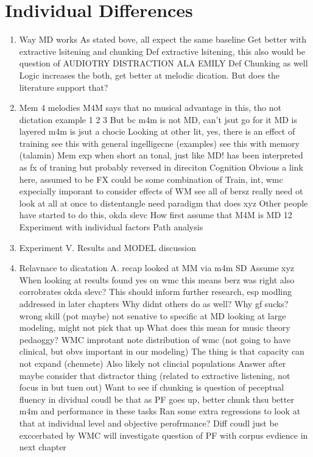 \documentclass[]{book}
\begin{document}
\hypertarget{individual-differences-1}{%
\section{Individual Differences}\label{individual-differences-1}}

\begin{enumerate}
\def\labelenumi{\Roman{enumi}.}
\setcounter{enumi}{1}
\item
  Way MD works
  As stated bove, all expect the same baseline
  Get better with extractive lsitening and chunking
  Def extractive lsitening, this also would be question of AUDIOTRY DISTRACTION ALA EMILY
  Def Chunking as well
  Logic increases the both, get better at melodic dication.
  But does the literature support that?
\item
  Mem 4 melodies
  M4M says that no musical advantage in this, tho not dictation
  example 1 2 3
  But bc m4m is not MD, can't jsut go for it
  MD is layered
  m4m is jsut a chocie
  Looking at other lit, yes, there is an effect of training
  see this with general ingelligecne (examples)
  see this with memory (talamin)
  Mem exp when short an tonal, just like MD!
  has been interpreted as fx of traning
  but probably reversed in direciton
  Cognition
  Obvious a link here, assumed to be FX
  could be some combination of Train, int, wmc
  expecially imporant to consider effects of WM
  see all of bersz
  really need ot look at all at once to distentangle
  need paradigm that does xyz
  Other people have started to do this, okda slevc
  How
  first assume that M4M is MD 12
  Experiment with individual factors
  Path analysis
\item
  Experiment
  V. Results and MODEL discussion
\item
  Relavnace to dicatation
  A. recap looked at MM via m4m SD
  Assume xyz
  When looking at results found yes on wmc
  this means berz was right
  also corrobrates okda slevc?
  This should inform further research, esp modling addressed in later chapters
  Why didnt others do as well?
  Why gf sucks? wrong skill (pot maybe)
  not senative to specific at MD
  looking at large modeling, might not pick that up
  What does this mean for music theory pedaoggy?
  WMC improtant
  note distribution of wmc (not going to have clinical, but obvs important in our modeling)
  The thing is that capacity can not expand (chennete)
  Also likely not clincial populations
  Answer after maybe consider that distractor thing (related to extractive listening, not focus in but tuen out)
  Want to see if chunking is question of peceptual fluency in dividual
  coudl be that as PF goes up, better chunk
  thsu better m4m and performance in these tasks
  Ran some extra regressions to look at that at individual level and objective perofrmance?
  Diff coudl just be exccerbated by WMC
  will investigate question of PF with corpus evdience in next chapter
\end{enumerate}
\end{document}
